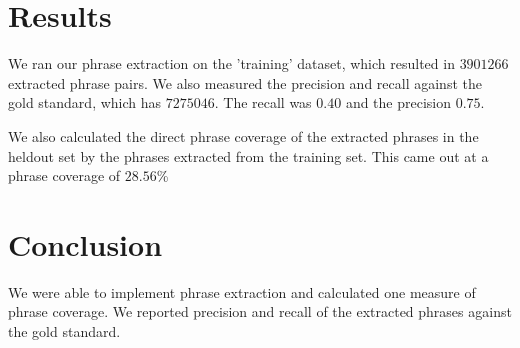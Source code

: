 \documentclass[11pt]{article}
\begin{document}
\section{Results}
We ran our phrase extraction on the 'training' dataset, which resulted in $3901266$ extracted phrase pairs. We also measured the precision and recall against the gold standard, which has $7275046$. The recall was $0.40$ and the precision $0.75$. 

We also calculated the direct phrase coverage of the extracted phrases in the heldout set by the phrases extracted from the training set. This came out at a phrase coverage of $28.56$\%

\section{Conclusion}
We were able to implement phrase extraction and calculated one measure of phrase coverage. We reported precision and recall of the extracted phrases against the gold standard.


\end{document}
